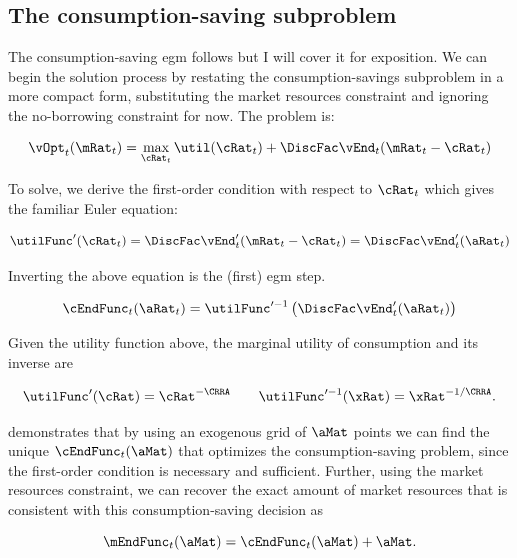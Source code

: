 \documentclass{article}
\begin{document}
\subsection{The consumption-saving subproblem}

The consumption-saving \acrshort{egm} follows \citet{Carroll2006} but I will cover it for exposition. We can begin the solution process by restating the consumption-savings subproblem in a more compact form, substituting the market resources constraint and ignoring the no-borrowing constraint for now. The problem is:

\begin{equation}
\vOpt_{t}(\mRat_{t}) = \max_{\cRat_{t}} \util(\cRat_{t}) +
    \DiscFac \vEnd_{t}(\mRat_{t}-\cRat_{t})
\end{equation}

To solve, we derive the first-order condition with respect to $\cRat_{t}$ which gives the familiar Euler equation:

\begin{equation}
\utilFunc'(\cRat_t) = \DiscFac \vEnd_{t}'(\mRat_{t} - \cRat_{t}) = \DiscFac
    \vEnd_{t}'(\aRat_{t})
\end{equation}

Inverting the above equation is the (first) \acrshort{egm} step.

\begin{equation}
\cEndFunc_{t}(\aRat_{t}) = \utilFunc'^{-1}\left( \DiscFac \vEnd_{t}'(\aRat_{t})
    \right)
\end{equation}

Given the utility function above, the marginal utility of consumption and its inverse are

\begin{equation}
\utilFunc'(\cRat) = \cRat^{-\CRRA} \qquad \utilFunc'^{-1}(\xRat) =
    \xRat^{-1/\CRRA}.
\end{equation}

\citet{Carroll2006} demonstrates that by using an exogenous grid of $\aMat$ points we can find the unique $\cEndFunc_{t}(\aMat)$ that optimizes the consumption-saving problem, since the first-order condition is necessary and sufficient. Further, using the market resources constraint, we can recover the exact amount of market resources that is consistent with this consumption-saving decision as

\begin{equation}
\mEndFunc_{t}(\aMat) = \cEndFunc_{t}(\aMat) + \aMat.
\end{equation}
\end{document}
